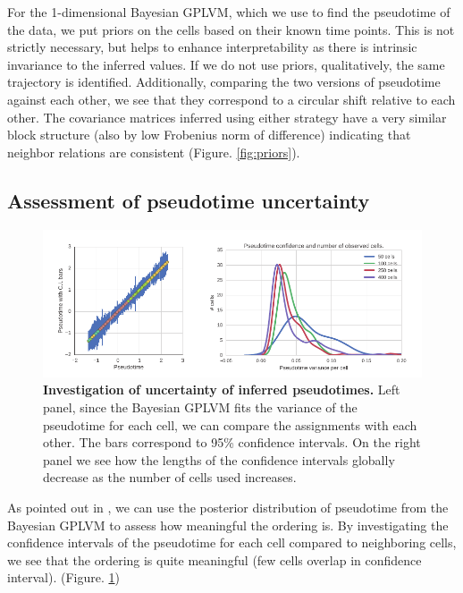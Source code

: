 For the 1-dimensional Bayesian GPLVM, which we use to find the pseudotime of the data, we put priors on the cells based on their known time points. This is not strictly necessary, but helps to enhance interpretability as there is intrinsic invariance to the inferred values. If we do not use priors, qualitatively, the same trajectory is identified. Additionally, comparing the two versions of pseudotime against each other, we see that they correspond to a circular shift relative to each other. The covariance matrices inferred using either strategy have a very similar block structure (also by low Frobenius norm of difference) indicating that neighbor relations are consistent (Figure. \ref{fig:priors}).

\subsection{Assessment of pseudotime uncertainty}

\begin{figure}
    \centering
    \includegraphics[width=\textwidth]{"pseudotime-uncertainty"}
    \caption[Investigation of uncertainty of inferred pseudotimes]{\textbf{Investigation of uncertainty of inferred pseudotimes.} Left panel, since the Bayesian GPLVM fits the variance of the pseudotime for each cell, we can compare the assignments with each other. The bars correspond to 95\% confidence intervals. On the right panel we see how the lengths of the confidence intervals globally decrease as the number of cells used increases.}
    \label{fig:pseudotime-certainty}
\end{figure}

As pointed out in \cite{Campbell2015-du}, we can use the posterior distribution of pseudotime from the Bayesian GPLVM to assess how meaningful the ordering is. By investigating the confidence intervals of the pseudotime for each cell compared to neighboring cells, we see that the ordering is quite meaningful (few cells overlap in confidence interval). (Figure. \ref{fig:pseudotime-certainty})

